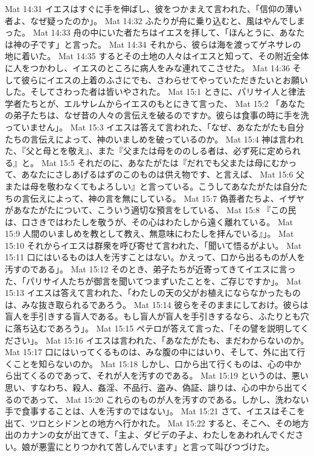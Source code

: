Mat 14:31  イエスはすぐに手を伸ばし、彼をつかまえて言われた、「信仰の薄い者よ、なぜ疑ったのか」。
Mat 14:32  ふたりが舟に乗り込むと、風はやんでしまった。
Mat 14:33  舟の中にいた者たちはイエスを拝して、「ほんとうに、あなたは神の子です」と言った。
Mat 14:34  それから、彼らは海を渡ってゲネサレの地に着いた。
Mat 14:35  するとその土地の人々はイエスと知って、その附近全体に人をつかわし、イエスのところに病人をみな連れてこさせた。
Mat 14:36  そして彼らにイエスの上着のふさにでも、さわらせてやっていただきたいとお願いした。そしてさわった者は皆いやされた。
Mat 15:1  ときに、パリサイ人と律法学者たちとが、エルサレムからイエスのもとにきて言った、
Mat 15:2  「あなたの弟子たちは、なぜ昔の人々の言伝えを破るのですか。彼らは食事の時に手を洗っていません」。
Mat 15:3  イエスは答えて言われた、「なぜ、あなたがたも自分たちの言伝えによって、神のいましめを破っているのか。
Mat 15:4  神は言われた、『父と母とを敬え』、また『父または母をののしる者は、必ず死に定められる』と。
Mat 15:5  それだのに、あなたがたは『だれでも父または母にむかって、あなたにさしあげるはずのこのものは供え物です、と言えば、
Mat 15:6  父または母を敬わなくてもよろしい』と言っている。こうしてあなたがたは自分たちの言伝えによって、神の言を無にしている。
Mat 15:7  偽善者たちよ、イザヤがあなたがたについて、こういう適切な預言をしている、
Mat 15:8  『この民は、口さきではわたしを敬うが、その心はわたしから遠く離れている。
Mat 15:9  人間のいましめを教として教え、無意味にわたしを拝んでいる』」。
Mat 15:10  それからイエスは群衆を呼び寄せて言われた、「聞いて悟るがよい。
Mat 15:11  口にはいるものは人を汚すことはない。かえって、口から出るものが人を汚すのである」。
Mat 15:12  そのとき、弟子たちが近寄ってきてイエスに言った、「パリサイ人たちが御言を聞いてつまずいたことを、ご存じですか」。
Mat 15:13  イエスは答えて言われた、「わたしの天の父がお植えにならなかったものは、みな抜き取られるであろう。
Mat 15:14  彼らをそのままにしておけ。彼らは盲人を手引きする盲人である。もし盲人が盲人を手引きするなら、ふたりとも穴に落ち込むであろう」。
Mat 15:15  ペテロが答えて言った、「その譬を説明してください」。
Mat 15:16  イエスは言われた、「あなたがたも、まだわからないのか。
Mat 15:17  口にはいってくるものは、みな腹の中にはいり、そして、外に出て行くことを知らないのか。
Mat 15:18  しかし、口から出て行くものは、心の中から出てくるのであって、それが人を汚すのである。
Mat 15:19  というのは、悪い思い、すなわち、殺人、姦淫、不品行、盗み、偽証、誹りは、心の中から出てくるのであって、
Mat 15:20  これらのものが人を汚すのである。しかし、洗わない手で食事することは、人を汚すのではない」。
Mat 15:21  さて、イエスはそこを出て、ツロとシドンとの地方へ行かれた。
Mat 15:22  すると、そこへ、その地方出のカナンの女が出てきて、「主よ、ダビデの子よ、わたしをあわれんでください。娘が悪霊にとりつかれて苦しんでいます」と言って叫びつづけた。
